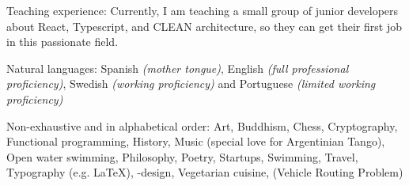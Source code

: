 \documentclass[10pt,a4paper]{article}
\begin{document}

\inlineheadsection  %
  {Teaching experience:}
  {  Currently, I am teaching a small group of junior developers about React, Typescript, and CLEAN architecture, so they can get their first job in this passionate field. }

\vspace{0.5em}
\inlineheadsection
  {Natural languages:}
  {Spanish \emph{(mother tongue)}, English \emph{(full professional proficiency)}, Swedish \emph{(working proficiency)} and Portuguese \emph{(limited working proficiency)} }


\spacedhrule{1.6em}{-0.4em}


\inlineheadsection
  {Non-exhaustive and in alphabetical order:}
  {Art, Buddhism, Chess, Cryptography, Functional programming, History, Music (special love for Argentinian Tango), Open water swimming, Philosophy, Poetry, Startups, Swimming, Travel, Typography (e.g. \LaTeX), -design, Vegetarian cuisine,  (Vehicle Routing Problem)}
\end{document}
